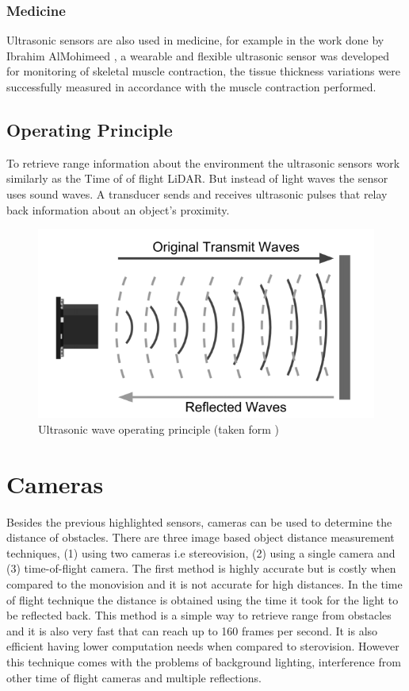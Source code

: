 \subsubsection{Medicine}
Ultrasonic sensors are also used in medicine, for example in the work done by Ibrahim AlMohimeed \cite{}, a wearable and flexible ultrasonic sensor was developed for monitoring of skeletal muscle contraction, the tissue thickness variations were successfully measured in accordance with the muscle contraction performed. 
\subsection{Operating Principle}
To retrieve range information about the environment the ultrasonic sensors work similarly as the  Time of of flight \ac{LiDAR}. But instead of light waves the sensor uses sound waves. A transducer sends and receives ultrasonic pulses that relay back information about an object’s proximity.  

\begin{figure}[ht] 
\centerline{\includegraphics [width=0.8 \textwidth]{imgs/chapter2/us.png}}
\caption[Ultrasonic wave operating principle]{Ultrasonic wave operating principle (taken form \cite{burnett_2019})}
\label{fig:us}
\end{figure}

\section{Cameras}
Besides the previous highlighted sensors, cameras can be used to determine the distance of obstacles. There are three image based object distance measurement techniques, (1) using two cameras i.e stereovision, (2) using a single camera and (3) time-of-flight camera.
The first method is highly accurate but is costly when compared to the monovision and it is not accurate for high distances. In the time of flight technique the distance is obtained using the time it took for the light to be reflected back. This method is a simple way to retrieve range from obstacles and it is also very fast that can reach up to 160 frames per second. It is also efficient having lower computation needs when compared to sterovision. However this technique comes with the problems of background lighting, interference from other time of flight cameras and multiple reflections. 
